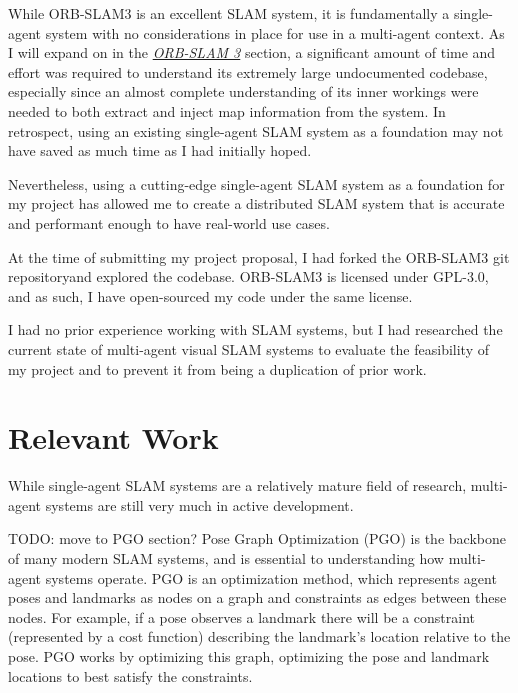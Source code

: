 While ORB-SLAM3 is an excellent SLAM system, it is fundamentally a single-agent system with no considerations in place for use in a multi-agent context. As I will expand on in the \hyperref[sec:orb-slam-3]{\textit{ORB-SLAM 3}} section, a significant amount of time and effort was required to understand its extremely large undocumented codebase, especially since an almost complete understanding of its inner workings were needed to both extract and inject map information from the system. In retrospect, using an existing single-agent SLAM system as a foundation may not have saved as much time as I had initially hoped.

Nevertheless, using a cutting-edge single-agent SLAM system as a foundation for my project has allowed me to create a distributed SLAM system that is accurate and performant enough to have real-world use cases.

At the time of submitting my project proposal, I had forked the ORB-SLAM3 \autocite{ORBSLAM3_TRO} git repository\footnotemark[1] and explored the codebase. ORB-SLAM3 is licensed under GPL-3.0, and as such, I have open-sourced my code under the same license\footnotemark[2].


I had no prior experience working with SLAM systems, but I had researched the current state of multi-agent visual SLAM systems to evaluate the feasibility of my project and to prevent it from being a duplication of prior work.

\section{Relevant Work}
\label{sec:relevant-work}
While single-agent SLAM systems are a relatively mature field of research, multi-agent systems are still very much in active development.


TODO: move to PGO section?
Pose Graph Optimization (PGO) is the backbone of many modern SLAM systems, and is essential to understanding how multi-agent systems operate. PGO is an optimization method, which represents agent poses and landmarks as nodes on a graph and constraints as edges between these nodes. For example, if a pose observes a landmark there will be a constraint (represented by a cost function) describing the landmark's location relative to the pose. PGO works by optimizing this graph, optimizing the pose and landmark locations to best satisfy the constraints.

